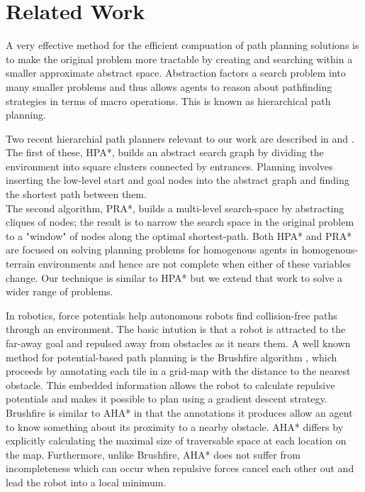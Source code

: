 \section{Related Work}
A very effective method for the efficient compuation of path planning solutions is to make the original problem more tractable by creating and searching within a smaller approximate abstract space. Abstraction factors a search problem into many smaller problems and thus allows agents to reason about pathfinding strategies in terms of macro operations. This is known as hierarchical path planning. 
\par
\indent Two recent hierarchial path planners relevant to our work are described in \cite{botea04} and \cite{sturtevant05}. The first of these, HPA*, builds an  abstract search graph by dividing the environment into square clusters connected by entrances. Planning involves inserting the low-level start and goal nodes into the abstract graph and finding the shortest path between them. \\
The second algorithm, PRA*, builds a multi-level search-space by abstracting cliques of nodes; the result is to narrow the search space in the original problem to a "window" of nodes along the optimal shortest-path.
Both HPA* and PRA* are focused on solving planning problems for homogenous agents in homogenous-terrain environments and hence are not complete when either of these variables change. 
Our technique is similar to HPA* but we extend that work to solve a wider range of problems. 
\par 
\indent In robotics, force potentials help autonomous robots find collision-free paths through an environment. The basic intution is that a robot is attracted to the far-away goal and repulsed away from obstacles as it nears them. A well known method for potential-based path planning is the Brushfire algorithm \cite{latombe91}, which proceeds by annotating each tile in a grid-map with the distance to the nearest obstacle. This embedded information allows the robot to calculate repulsive potentials and makes it possible to plan using a gradient descent strategy. 
Brushfire is similar to AHA* in that the annotations it produces allow an agent to know something about its proximity to a nearby obstacle. 
AHA* differs by explicitly calculating the maximal size of traversable space at each location on the map. 
Furthermore, unlike Brushfire, AHA* does not suffer from incompleteness which can occur when repulsive forces cancel each other out and lead the robot into a local minimum. 
\par
